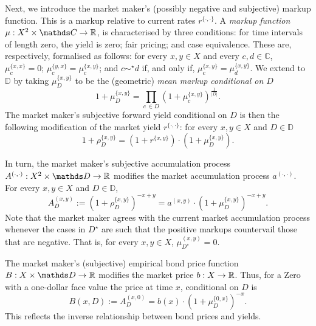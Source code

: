 \documentclass[12pt,a4paper,twoside]{article}
\newcommand{\mbbd}{{\mathds D}}
\newcommand{\mbbc}{{\mathds C}}
\newcommand{\past}{{D^\star}}
\newcommand{\xy}{{(x, y)}}
\newcommand{\dd}{{(\cdot,\cdot)}}
\begin{document}
Next, we introduce the market maker's (possibly negative and subjective) markup
function. This is a markup relative to current rates $r^{\{\cdot, \cdot\}}$.  A
\emph{markup function} $\mu : X^2 \times \mbbc \rightarrow \R$, is
characterised by three conditions: for time intervals of length zero, the yield
is zero; fair pricing; and case equivalence.  These are, respectively,
formalised as follows: for every $x,y\in X$ and every $c , d\in \mbbc$,
$\mu^{\{x,x\}}_{c} = 0$; $\mu^{\{y,x\}}_{c} = \mu^{\{x,y\}}_{c}$; and $c
\sim^{\star} d$ if, and only if, $\mu^{\{x,y\}}_{c} = \mu^{\{x,y\}}_{d}$.  We
extend to $\mbbd$ by taking $\mu^{\{x, y\}}_{D}$ to be the (geometric)
\emph{mean markup conditional on $D$}
\begin{equation*} 1 + \mu^{\{x, y\}}_{D}
= \prod_{c\,\in D} \left(1 + \mu^{\{x, y\}}_{c}\right)^{\frac{1}{\lvert D
  \rvert}}.
\end{equation*}
The market maker's subjective forward yield conditional on $D$ is then
the following modification of the market yield $r^{\{\cdot,\cdot\}}$:
for every $x,y\in X$ and $D \in \mbbd$
\begin{equation*}
  1 + \rho^{\{x,y\}}_{D} = \left(1 + r^{\{x,y\}}\right)\cdot\left(1 +
  \mu^{\{x,y\}}_{D}\right).
\end{equation*}

In turn, the market maker's subjective accumulation process ${A^{\dd}}: X^2
\times \mbbd \rightarrow \R$ modifies the market accumulation process
$a^{\dd}$. For every $x, y \in X$ and $D \in\mbbd$,
\begin{equation*}
  {A}^{\xy}_{D} := \left(1 + \rho^{\{x,y\}}_{D}\right)^{-x + y} = a^{\xy} \cdot
  \left(1 + \mu^{\{x, y\}}_{D}\right)^{-x + y}.
\end{equation*}
Note that the market maker agrees with the current market accumulation process
whenever the cases in $\past$ are such that the positive markups countervail
those that are negative. That is, for every $x, y \in X$, ${\mu}^{\xy}_{\past}
= 0$.

The market maker's (subjective) empirical bond price function $B : X \times
\mbbd \rightarrow \R$ modifies the market price $b: X \rightarrow \mathbb R$. Thus,
for a Zero with a one-dollar face value the price at time $x$, conditional on
$D$ is 
\begin{equation*} B(x,D) := {A}^{(x, 0)}_{D} =
  b(x) \cdot \left( 1 + \mu^{\{0,x\}}_{D} \right)^{-x} .
\end{equation*}
This reflects the inverse relationship between bond prices and yields.  
\end{document}
